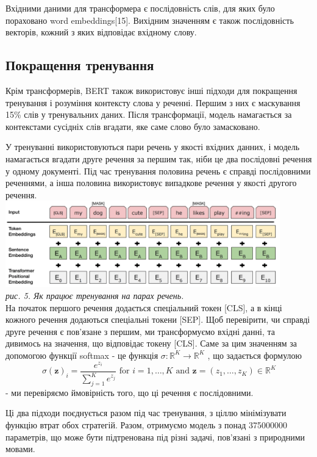 Вхідними даними для трансформера є послідовність слів, для яких було пораховано word embeddings[15]. Вихідним значенням є також послідовність векторів, кожний з яких відповідає вхідному слову.

\subsection{Покращення тренування}
Крім трансформерів, BERT також використовує інші підходи для покращення тренування і розуміння контексту слова у реченні. Першим з них є маскування 15\% слів у тренувальних даних. Після трансформації, модель намагається за контекстами сусідніх слів вгадати, яке саме слово було замасковано. 

У тренуванні використовуються пари речень у якості вхідних данних, і модель намагається вгадати друге речення за першим так, ніби це два послідовні речення у одному документі. Під час тренування половина речень є справді послідовними реченнями, а інша половина використовує випадкове речення у якості другого речення.
\includegraphics[width = 450]{Dissertation/bert_ex.png}\\
\textit{рис. 5. Як працює тренування на парах речень. }\\
На початок першого речення додається спеціальний токен [CLS], а в кінці кожного речення додаються спеціальні токени [SEP]. Щоб перевірити, чи справді друге речення є пов'язане з першим, ми трансформуємо вхідні данні, та дивимось на значення, що відповідає токену [CLS]. Саме за цим значенням за допомогою функції softmax - це функція $\sigma: \mathbb{R}^{K} \rightarrow \mathbb{R}^{K}$ , що задається формулою
\[
\sigma(\mathbf{z})_{i}=\frac{e^{z_{i}}}{\sum_{j=1}^{K} e^{z_{j}}} \text { for } i=1, \ldots, K \text { and } \mathbf{z}=\left(z_{1}, \ldots, z_{K}\right) \in \mathbb{R}^{K}
\]
 - ми перевіряємо ймовірність того, що ці речення є послідовними.

Ці два підходи поєднується разом під час тренування, з ціллю мінімізувати функцію втрат обох стратегій. Разом, отримуємо модель з понад 375000000 параметрів, що може бути підтренована під різні задачі, пов'язані з природними мовами.
